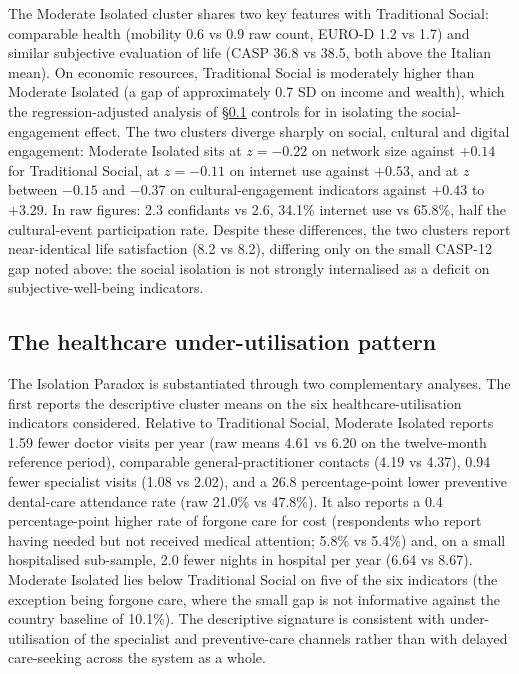 The Moderate Isolated cluster shares two key features with Traditional Social: comparable health (mobility 0.6 vs 0.9 raw count, EURO-D 1.2 vs 1.7) and similar subjective evaluation of life (CASP 36.8 vs 38.5, both above the Italian mean). On economic resources, Traditional Social is moderately higher than Moderate Isolated (a gap of approximately 0.7 SD on income and wealth), which the regression-adjusted analysis of \S\ref{sec:ch4-isolation-healthcare} controls for in isolating the social-engagement effect. The two clusters diverge sharply on social, cultural and digital engagement: Moderate Isolated sits at $z = -0.22$ on network size against $+0.14$ for Traditional Social, at $z = -0.11$ on internet use against $+0.53$, and at $z$ between $-0.15$ and $-0.37$ on cultural-engagement indicators against $+0.43$ to $+3.29$. In raw figures: 2.3 confidants vs 2.6, 34.1\% internet use vs 65.8\%, half the cultural-event participation rate. Despite these differences, the two clusters report near-identical life satisfaction (8.2 vs 8.2), differing only on the small CASP-12 gap noted above: the social isolation is not strongly internalised as a deficit on subjective-well-being indicators.

\subsection{The healthcare under-utilisation pattern}
\label{sec:ch4-isolation-healthcare}

The Isolation Paradox is substantiated through two complementary analyses. The first reports the descriptive cluster means on the six healthcare-utilisation indicators considered. Relative to Traditional Social, Moderate Isolated reports 1.59 fewer doctor visits per year (raw means 4.61 vs 6.20 on the twelve-month reference period), comparable general-practitioner contacts (4.19 vs 4.37), 0.94 fewer specialist visits (1.08 vs 2.02), and a 26.8 percentage-point lower preventive dental-care attendance rate (raw 21.0\% vs 47.8\%). It also reports a 0.4 percentage-point higher rate of forgone care for cost (respondents who report having needed but not received medical attention; 5.8\% vs 5.4\%) and, on a small hospitalised sub-sample, 2.0 fewer nights in hospital per year (6.64 vs 8.67). Moderate Isolated lies below Traditional Social on five of the six indicators (the exception being forgone care, where the small gap is not informative against the country baseline of 10.1\%). The descriptive signature is consistent with under-utilisation of the specialist and preventive-care channels rather than with delayed care-seeking across the system as a whole.

